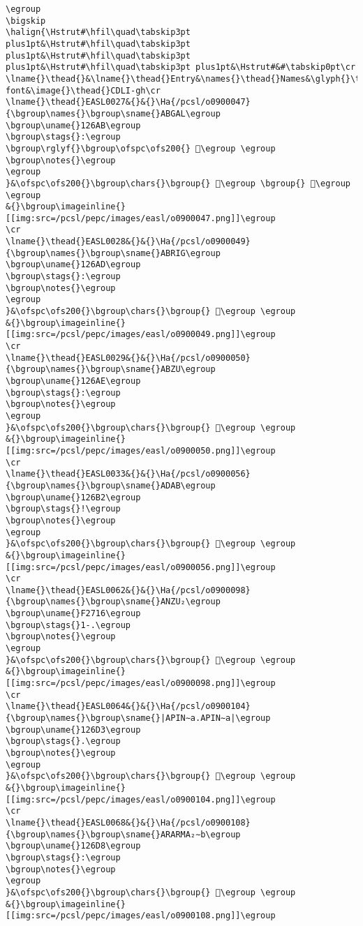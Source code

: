 \begin{verbatim}
\egroup
\bigskip
\halign{\Hstrut#\hfil\quad\tabskip3pt plus1pt&\Hstrut#\hfil\quad\tabskip3pt plus1pt&\Hstrut#\hfil\quad\tabskip3pt plus1pt&\Hstrut#\hfil\quad\tabskip3pt plus1pt&\Hstrut#&#\tabskip0pt\cr
\lname{}\thead{}&\lname{}\thead{}Entry&\names{}\thead{}Names&\glyph{}\thead{}PC-font&\image{}\thead{}CDLI-gh\cr
\lname{}\thead{}EASL0027&{}&{}\Ha{/pcsl/o0900047}{\bgroup\names{}\bgroup\sname{}ABGAL\egroup
\bgroup\uname{}126AB\egroup
\bgroup\stags{}:\egroup
\bgroup\rglyf{}\bgroup\ofspc\ofs200{} 𒚫\egroup \egroup
\bgroup\notes{}\egroup
\egroup
}&\ofspc\ofs200{}\bgroup\chars{}\bgroup{} 𒚫\egroup \bgroup{} 𒚬\egroup \egroup
&{}\bgroup\imageinline{}[[img:src=/pcsl/pepc/images/easl/o0900047.png]]\egroup
\cr
\lname{}\thead{}EASL0028&{}&{}\Ha{/pcsl/o0900049}{\bgroup\names{}\bgroup\sname{}ABRIG\egroup
\bgroup\uname{}126AD\egroup
\bgroup\stags{}:\egroup
\bgroup\notes{}\egroup
\egroup
}&\ofspc\ofs200{}\bgroup\chars{}\bgroup{} 𒚭\egroup \egroup
&{}\bgroup\imageinline{}[[img:src=/pcsl/pepc/images/easl/o0900049.png]]\egroup
\cr
\lname{}\thead{}EASL0029&{}&{}\Ha{/pcsl/o0900050}{\bgroup\names{}\bgroup\sname{}ABZU\egroup
\bgroup\uname{}126AE\egroup
\bgroup\stags{}:\egroup
\bgroup\notes{}\egroup
\egroup
}&\ofspc\ofs200{}\bgroup\chars{}\bgroup{} 𒚮\egroup \egroup
&{}\bgroup\imageinline{}[[img:src=/pcsl/pepc/images/easl/o0900050.png]]\egroup
\cr
\lname{}\thead{}EASL0033&{}&{}\Ha{/pcsl/o0900056}{\bgroup\names{}\bgroup\sname{}ADAB\egroup
\bgroup\uname{}126B2\egroup
\bgroup\stags{}!\egroup
\bgroup\notes{}\egroup
\egroup
}&\ofspc\ofs200{}\bgroup\chars{}\bgroup{} 𒚲\egroup \egroup
&{}\bgroup\imageinline{}[[img:src=/pcsl/pepc/images/easl/o0900056.png]]\egroup
\cr
\lname{}\thead{}EASL0062&{}&{}\Ha{/pcsl/o0900098}{\bgroup\names{}\bgroup\sname{}ANZU₂\egroup
\bgroup\uname{}F2716\egroup
\bgroup\stags{}1-.\egroup
\bgroup\notes{}\egroup
\egroup
}&\ofspc\ofs200{}\bgroup\chars{}\bgroup{} 󲜖\egroup \egroup
&{}\bgroup\imageinline{}[[img:src=/pcsl/pepc/images/easl/o0900098.png]]\egroup
\cr
\lname{}\thead{}EASL0064&{}&{}\Ha{/pcsl/o0900104}{\bgroup\names{}\bgroup\sname{}|APIN∼a.APIN∼a|\egroup
\bgroup\uname{}126D3\egroup
\bgroup\stags{}.\egroup
\bgroup\notes{}\egroup
\egroup
}&\ofspc\ofs200{}\bgroup\chars{}\bgroup{} 𒛓\egroup \egroup
&{}\bgroup\imageinline{}[[img:src=/pcsl/pepc/images/easl/o0900104.png]]\egroup
\cr
\lname{}\thead{}EASL0068&{}&{}\Ha{/pcsl/o0900108}{\bgroup\names{}\bgroup\sname{}ARARMA₂∼b\egroup
\bgroup\uname{}126D8\egroup
\bgroup\stags{}:\egroup
\bgroup\notes{}\egroup
\egroup
}&\ofspc\ofs200{}\bgroup\chars{}\bgroup{} 𒛘\egroup \egroup
&{}\bgroup\imageinline{}[[img:src=/pcsl/pepc/images/easl/o0900108.png]]\egroup

\end{verbatim}

